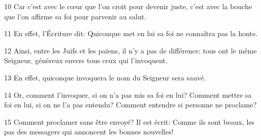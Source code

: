 
10 Car c’est avec le cœur que l’on croit pour devenir juste, c’est avec la bouche que l’on affirme sa foi pour parvenir au salut.

11 En effet, l’Écriture dit: Quiconque met en lui sa foi ne connaîtra pas la honte.

12 Ainsi, entre les Juifs et les païens, il n’y a pas de différence: tous ont le même Seigneur, généreux envers tous ceux qui l’invoquent.

13 En effet, quiconque invoquera le nom du Seigneur sera sauvé.

14 Or, comment l’invoquer, si on n’a pas mis sa foi en lui? Comment mettre sa foi en lui, si on ne l’a pas entendu? Comment entendre si personne ne proclame?

15 Comment proclamer sans être envoyé? Il est écrit: Comme ils sont beaux, les pas des messagers qui annoncent les bonnes nouvelles!
